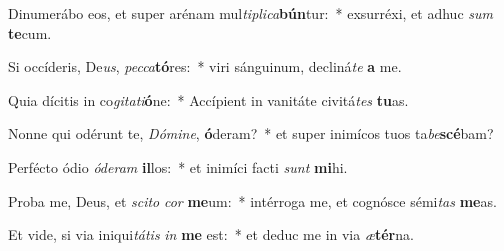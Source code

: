 \item Dinumerábo eos, et super arénam mul\textit{ti}\textit{pli}\textit{ca}\textbf{bún}tur:~* exsurréxi, et adhuc \textit{sum} \textbf{te}cum.
\item Si occíderis, De\textit{us}, \textit{pec}\textit{ca}\textbf{tó}res:~* viri sánguinum, decliná\textit{te} \textbf{a} me.
\item Quia dícitis in co\textit{gi}\textit{ta}\textit{ti}\textbf{ó}ne:~* Accípient in vanitáte civitá\textit{tes} \textbf{tu}as.
\item Nonne qui odérunt te, \textit{Dó}\textit{mi}\textit{ne}, \textbf{ó}deram?~* et super inimícos tuos ta\textit{be}\textbf{scé}bam?
\item Perfécto ódio \textit{ó}\textit{de}\textit{ram} \textbf{il}los:~* et inimíci facti \textit{sunt} \textbf{mi}hi.
\item Proba me, Deus, et \textit{sci}\textit{to} \textit{cor} \textbf{me}um:~* intérroga me, et cognósce sémi\textit{tas} \textbf{me}as.
\item Et vide, si via iniqui\textit{tá}\textit{tis} \textit{in} \textbf{me} est:~* et deduc me in via \textit{æ}\textbf{tér}na.
